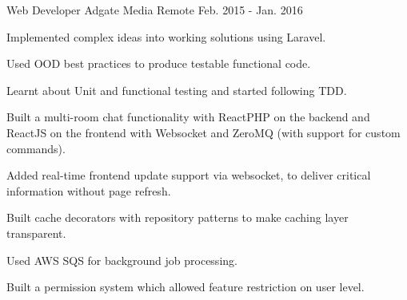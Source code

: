 \begin{cventries}
  \cventry
    {Web Developer} %
    {Adgate Media} %
    {Remote} %
    {Feb. 2015 - Jan. 2016} %
    {
      \begin{cvitems} %
        \item {Implemented complex ideas into working solutions using Laravel.}
        \item {Used OOD best practices to produce testable functional code.}
        \item {Learnt about Unit and functional testing and started following TDD.}
        \item {Built a multi-room chat functionality with ReactPHP on the backend and ReactJS on the frontend with Websocket and ZeroMQ (with support for custom commands).}
        \item {Added real-time frontend update support via websocket, to deliver critical information without page refresh.}
        \item {Built cache decorators with repository patterns to make caching layer transparent.}
        \item {Used AWS SQS for background job processing.}
        \item {Built a permission system which allowed feature restriction on user level.}
      \end{cvitems}
    }


\end{cventries}
